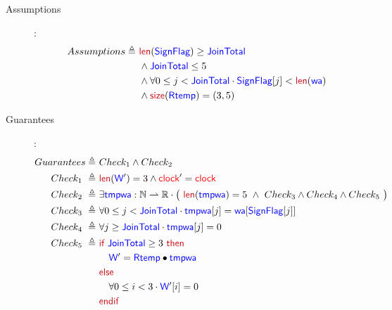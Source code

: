 \documentclass[fleqn,a4paper]{article}
\newcommand\Var[1]{\textcolor{blue}{\textsf{#1}}}
\newcommand\syntax[1]{\textcolor[RGB]{202,12,22}{\textsf{#1}}}
\newcommand\clock{\textcolor{red}{\textsf{clock}}}
\newcommand\definedby{\triangleq}
\begin{document}
\begin{description}

\item[Assumptions]:
\begin{align*}
Assumptions \definedby \
& \syntax{len}(\Var{SignFlag}) \geq \Var{JoinTotal} \\
& \wedge \Var{JoinTotal} \leq 5 \\
& \wedge \forall 0 \leq j < \Var{JoinTotal} \cdot \Var{SignFlag}[j] < \syntax{len}(\Var{wa}) \\
& \wedge \syntax{size}(\Var{Rtemp}) = (3,5)
\end{align*}

\item[Guarantees]:
\begin{align*}
Guarantees \definedby \
& Check_1 \wedge Check_2 \\
Check_1 \ \definedby \
& \syntax{len}(\Var{W}') = 3 \wedge \clock'=\clock \\
Check_2 \ \definedby \
& \exists \Var{tmpwa} : \mathbb{N} \rightharpoonup \mathbb{R} \cdot
\big{(} \
\syntax{len}(\Var{tmpwa}) = 5 \
\wedge \ Check_3 \wedge Check_4 \wedge Check_5 \
\big{)} \\
Check_3 \ \definedby \
& \forall 0 \leq j < \Var{JoinTotal} \cdot \Var{tmpwa}[j] = \Var{wa}[\Var{SignFlag}[j]] \\
Check_4 \ \definedby \
& \forall j \geq \Var{JoinTotal} \cdot \Var{tmpwa}[j] = 0 \\
Check_5 \ \definedby \
& \syntax{if } \Var{JoinTotal} \geq 3 \syntax{ then } \\
& \quad \Var{W}' = \Var{Rtemp} \bullet \Var{tmpwa} \\
& \syntax{else} \\
& \quad \forall 0 \leq i < 3 \cdot \Var{W}'[i] = 0 \\
& \syntax{endif}
\end{align*}

\end{description}
\end{document}
